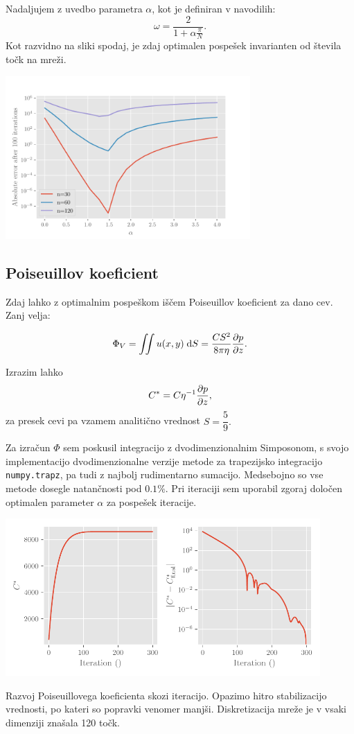 Nadaljujem z uvedbo parametra $\alpha$, kot je definiran v navodilih:
\[\omega = \frac{2}{1+\alpha \frac{\pi}{N}}.\]
Kot razvidno na sliki spodaj, je zdaj optimalen pospešek invarianten od števila točk na mreži.
\begin{center}
    \includegraphics[width=0.7\textwidth]{../old/1-alphas.pdf}
\end{center}
\subsection{Poiseuillov koeficient}
Zdaj lahko z optimalnim pospeškom iščem Poiseuillov koeficient za dano cev. Zanj velja:

\[ \Phi_V = \iint u(x,y) \; \mathrm{d}S = \frac{C S^2}{8 \pi \eta} \frac{\partial p}{\partial z}.\]

Izrazim lahko \[ C^{*} = C \eta^{-1} \frac{\partial p}{\partial z},\] za presek cevi pa vzamem analitično vrednost $S = \dfrac{5}{9}.$

Za izračun $\Phi$ sem poskusil integracijo z dvodimenzionalnim Simposonom, s svojo implementacijo dvodimenzionalne verzije metode za trapezijsko integracijo \texttt{numpy.trapz}, pa tudi z najbolj rudimentarno sumacijo. Medsebojno so vse metode dosegle natančnosti pod $0.1 \%$. Pri iteraciji sem uporabil zgoraj določen optimalen parameter $\alpha$ za pospešek iteracije.

\begin{center}
    \includegraphics[width=0.9\textwidth]{../old/1-C.pdf}


    {Razvoj Poiseuillovega koeficienta skozi iteracijo. Opazimo hitro stabilizacijo vrednosti, po kateri so popravki venomer manjši. Diskretizacija mreže je v vsaki dimenziji znašala 120 točk.}
\end{center}

